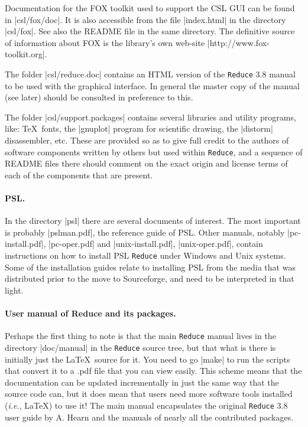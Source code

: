 \documentclass[12pt,twoside,openright]{memoir}
\newcommand{\reduce}{\texttt{Reduce}\xspace}
\begin{document}
Documentation for the FOX toolkit used to support the CSL GUI
can be found in |csl/fox/doc|. It is also accessible from the
file |index.html| in the directory |csl/fox|. See also the README file in the
same directory. The definitive source of information about FOX is the
library's own web-site |http://www.fox-toolkit.org|.

The folder |csl/reduce.doc| contains an HTML version of the \reduce 3.8 manual
to be used with the graphical interface. In general the master copy of the
manual (see later) should be consulted in preference to this.

The folder |csl/support.packages| contains several libraries and utility
programs, like: \TeX\ fonts, the |gnuplot| program for scientific drawing, the
|distorm| disassembler, etc.  These are provided so as to give full credit to
the authors of software components written by others but used within
\reduce, and a sequence of README files there should comment on the
exact origin and license terms of each of the components that are
present.

\paragraph{PSL.} In the directory |psl| there are several documents of
interest. The most important is probably |pslman.pdf|, the reference guide of
PSL. Other manuals, notably |pc-install.pdf|, |pc-oper.pdf| and
|unix-install.pdf|, |unix-oper.pdf|, contain instructions on how to install PSL
\reduce under Windows and Unix systems. Some of the installation guides
relate to installing PSL from the media that was distributed prior to the
move to Sourceforge, and need to be interpreted in that light.

\paragraph{User manual of Reduce and its packages.}
Perhaps the first thing to note is that the
main \reduce manual lives in the directory |doc/manual| in the \reduce source
tree, but that what is there is initially just the \LaTeX\ source for it. You
need to go |make| to run the scripts that convert it to a .pdf file that you
can view easily. This scheme means that the documentation can be updated
incrementally in just the same way that the source code can, but it does mean
that users need more software tools installed (\emph{i.e.}, \LaTeX) to use it!
The main manual encapsulates the original \reduce 3.8 user guide by A. Hearn
and the manuals of nearly all the contributed packages.
\end{document}
